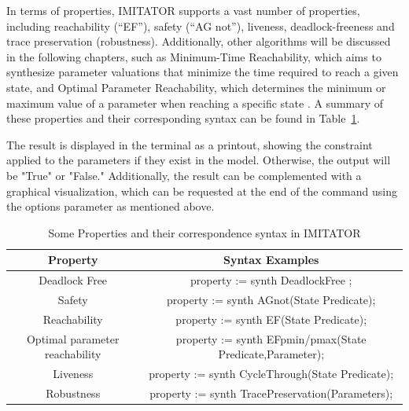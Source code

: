 In terms of properties, IMITATOR supports a vast number of properties, including reachability (“EF”), safety (“AG not”), liveness, deadlock-freeness and trace preservation (robustness). Additionally, other algorithms will be discussed in the following chapters, such as Minimum-Time Reachability, which aims to synthesize parameter valuations that minimize the time required to reach a given state, and Optimal Parameter Reachability, which determines the minimum or maximum value of a parameter when reaching a specific state \cite{IMITATOR}. A summary of these properties and their corresponding syntax can be found in Table~\ref{tab:imitator-properties}.




The result is displayed in the terminal as a printout, showing the constraint applied to the parameters if they exist in the model. Otherwise, the output will be "True" or "False." Additionally, the result can be complemented with a graphical visualization, which can be requested at the end of the command using the options parameter as mentioned above.
\vspace{1cm}


\begin{table}[H]
\centering
\caption{Some Properties and their correspondence syntax in IMITATOR \cite{IMITATOR}}
\label{tab:imitator-properties}
\begin{tabular}{|c|c|}
\hline
\textbf{Property} & \textbf{Syntax Examples} \\ \hline
Deadlock Free & property := synth DeadlockFree ; \\ \hline
Safety & property := synth AGnot(State Predicate); \\ \hline
Reachability & property := synth EF(State Predicate); \\ \hline
Optimal parameter reachability & property := synth EFpmin/pmax(State Predicate,Parameter); %
\\ \hline
Liveness & property := synth CycleThrough(State Predicate); \\ \hline
Robustness & property := synth TracePreservation(Parameters); \\ \hline
\end{tabular}
\end{table}

